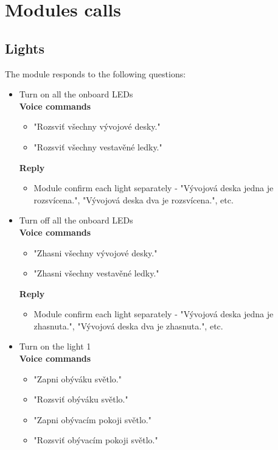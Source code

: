 \chapter{Modules calls} \label{app:modules_calls}

\section{Lights} \label{section:app_lights}
The module responds to the following questions:
\begin{itemize}
    \item Turn on all the onboard LEDs\\
    \textbf{Voice commands}
    \begin{itemize}
        \item "Rozsviť všechny vývojové desky."
        \item "Rozsviť všechny vestavěné ledky."
    \end{itemize}
    \textbf{Reply}
    \begin{itemize}
        \item Module confirm each light separately - "Vývojová deska jedna je rozsvícena.", "Vývojová deska dva je rozsvícena.", etc.
    \end{itemize}
    \item Turn off all the onboard LEDs\\
    \textbf{Voice commands}
    \begin{itemize}
        \item "Zhasni všechny vývojové desky."
        \item "Zhasni všechny vestavěné ledky."
    \end{itemize}
    \textbf{Reply}
    \begin{itemize}
        \item Module confirm each light separately - "Vývojová deska jedna je zhasnuta.", "Vývojová deska dva je zhasnuta.", etc.
    \end{itemize}    
    \item Turn on the light 1\\
    \textbf{Voice commands}
    \begin{itemize}
        \item "Zapni obýváku světlo."
        \item "Rozsviť obýváku světlo."
        \item "Zapni obývacím pokoji světlo."
        \item "Rozsviť obývacím pokoji světlo."

\end{itemize}
\end{itemize}
